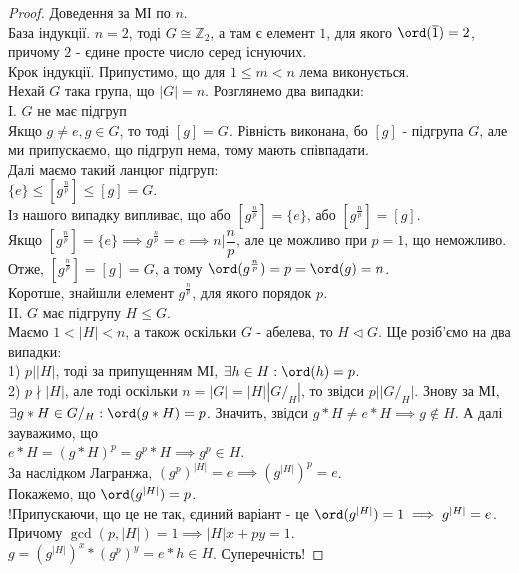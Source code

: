 \documentclass{math_library}
\begin{document}
\begin{proof}
Доведення за МІ по $n$.\\
База індукції. $n = 2$, тоді $G \cong \mathbb{Z}_2$, а там є елемент $1$, для якого $\ord(\overline{1}) = 2$, причому $2$ - єдине просте число серед існуючих.\\
Крок індукції. Припустимо, що для $1 \leq m < n$ лема виконується.\\
Нехай $G$ така група, що $|G| = n$. Розглянемо два випадки:\\
I. $G$ не має підгруп\\
Якщо $g \neq e, g \in G$, то тоді $[g] = G$. Рівність виконана, бо $[g]$ - підгрупа $G$, але ми припускаємо, що підгруп нема, тому мають співпадати.\\
Далі маємо такий ланцюг підгруп:\\
$\{e\} \leq [g^{\frac{n}{p}}] \leq [g] = G$.\\
Із нашого випадку випливає, що або $[g^{\frac{n}{p}}] = \{e\}$, або $[g^{\frac{n}{p}}] = [g]$.\\
Якщо $[g^{\frac{n}{p}}] = \{e\} \implies g^{\frac{n}{p}} = e \implies n | \dfrac{n}{p}$, але це можливо при $p=1$, що неможливо.\\
Отже, $[g^{\frac{n}{p}}] = [g] = G$, а тому $\ord(g^{\frac{n}{p}}) = p = \ord(g) = n$.\\
Коротше, знайшли елемент $g^{\frac{n}{p}}$, для якого порядок $p$.
\bigskip \\
II. $G$ має підгрупу $H \leq G$.\\
Маємо $1 < |H| < n$, а також оскільки $G$ - абелева, то $H \triangleleft G$. Ще розіб'ємо на два випадки:\\
1) $p | |H|$, тоді за припущенням МІ, $\exists h \in H: \ord(h) = p$.\\
2) $p \nmid |H|$, але тоді оскільки $n = |G| = |H| |G/_H|$, то звідси $p | |G/_H|$. Знову за МІ, $\exists g*H \in G/_H: \ord(g*H) = p$. Значить, звідси $g*H \neq e*H \implies g \not\in H$. А далі зауважимо, що\\
$e*H = (g*H)^p = g^p*H \implies g^p \in H$.\\
За наслідком Лагранжа, $(g^p)^{|H|} = e \implies (g^{|H|})^p = e$.\\
Покажемо, що $\ord(g^{|H|}) = p$. \\
!Припускаючи, що це не так, єдиний варіант - це $\ord(g^{|H|}) = 1 \implies g^{|H|} = e$. Причому $\gcd(p,|H|) = 1 \implies |H|x+py = 1$.\\
$g = (g^{|H|})^x * (g^p)^y = e*h \in H$. Суперечність!
\end{proof}
\end{document}

